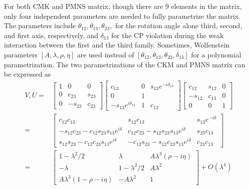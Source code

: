 \noindent  For both CMK and PMNS matrix, though there are 9 elements in the matrix, only four independent parameters are needed to fully parametrize the matrix. The parameters include $\theta_{12},\theta_{13},\theta_{23}, $ for the rotation angle alone third, second, and first axis, respectively, and $\delta_{13}$ for the CP violation during the weak interaction between the first and the third family. Sometimes, Wolfenstein parameters $[A,\lambda, \rho, \eta ]$ are used instead of  $ [ \theta_{12},\theta_{13},\theta_{23},\delta_{13} ]$  for a polynomial parametrization. The two parametrizations of the CKM and PMNS matrix can be expressed as
\begin{equation}
\begin{split}
    V, U =  & 
    \begin{bmatrix}
        1 &  0      & 0      \\ 
        0 &  c_{23} & s_{23} \\
        0 & -s_{23} & c_{23}  
    \end{bmatrix}
    \begin{bmatrix}
        c_{13} &  0      & s_{13} e^{-i\delta_{13}}     \\ 
        0 &  1 & \\
        -s_{13} e^{i\delta_{13}}    & 1 & c_{13}  
    \end{bmatrix}
    \begin{bmatrix}
        c_{12} &  s_{12}  & 0      \\ 
        -s_{12} &  c_{13} & 0 \\
        0 & 0 & 1  
    \end{bmatrix}\\
    = &\begin{bmatrix}
        c_{12}c_{13} & s_{12}c_{13} & s_{13}e^{-i\delta} \\ 
        -s_{12}c_{23}-c_{12}s_{23}s_{13}e^{i\delta} & c_{12}c_{23}-s_{12}s_{23}s_{13}e^{i\delta} & s_{23}c_{13} \\ 
        s_{12}s_{23}-c_{12}c_{23}s_{13}e^{i\delta} & -c_{12}s_{23}-s_{12}c_{23}s_{13}e^{i\delta} & c_{23}c_{13} 
    \end{bmatrix}\\
    =& \begin{bmatrix}
        1-\lambda^2/2 & \lambda & A\lambda^3(\rho-i\eta) \\ 
        -\lambda & 1-\lambda^2/2 & A\lambda^2 \\ 
        A\lambda^3(1-\rho-i\eta) & -A\lambda^2 & 1
    \end{bmatrix} + O(\lambda^4)  \\
\end{split}
\end{equation}

